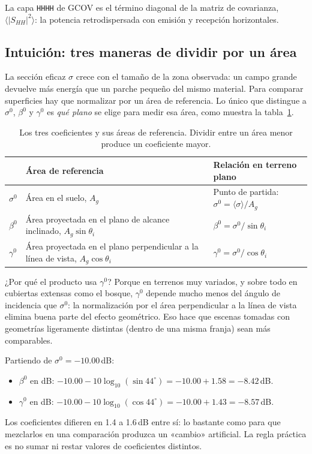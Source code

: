 \documentclass[11pt,a4paper]{article}
\begin{document}
La capa \texttt{HHHH} de GCOV es el término diagonal de la matriz de covarianza,
$\langle |S_{HH}|^2 \rangle$: la potencia retrodispersada con emisión y recepción horizontales.

\subsection{Intuición: tres maneras de dividir por un área}
\label{sec:tres-coef}

La sección eficaz $\sigma$ crece con el tamaño de la zona observada: un campo grande devuelve más energía que un
parche pequeño del mismo material. Para comparar superficies hay que normalizar por un área de referencia. Lo
único que distingue a $\sigma^0$, $\beta^0$ y $\gamma^0$ es \emph{qué plano} se elige para medir esa área,
como muestra la tabla~\ref{tab:areas-ref}.

\begin{table}[htbp]
\centering\small
\begin{tabularx}{\linewidth}{p{.1\linewidth}p{.38\linewidth}X}
\toprule
 & \textbf{Área de referencia} & \textbf{Relación en terreno plano}\\\midrule
$\sigma^0$ & Área en el suelo, $A_g$ & Punto de partida: $\sigma^0=\langle\sigma\rangle/A_g$\\
$\beta^0$ & Área proyectada en el plano de alcance inclinado, $A_g\sin\theta_i$ & $\beta^0=\sigma^0/\sin\theta_i$\\
$\gamma^0$ & Área proyectada en el plano perpendicular a la línea de vista, $A_g\cos\theta_i$ &
$\gamma^0=\sigma^0/\cos\theta_i$\\\bottomrule
\end{tabularx}
\caption{Los tres coeficientes y sus áreas de referencia. Dividir entre un área menor produce un coeficiente
mayor.}
\label{tab:areas-ref}
\end{table}

¿Por qué el producto usa $\gamma^0$? Porque en terrenos muy variados, y sobre todo en cubiertas extensas como
el bosque, $\gamma^0$ depende mucho menos del ángulo de incidencia que $\sigma^0$: la normalización por el área
perpendicular a la línea de vista elimina buena parte del efecto geométrico. Eso hace que escenas tomadas con
geometrías ligeramente distintas (dentro de una misma franja) sean más comparables.

\begin{ejemplo}[Los tres coeficientes con $\theta_i = 44^\circ$ en terreno plano]
Partiendo de $\sigma^0=-10.00$\,dB:
\begin{itemize}
  \item $\beta^0$ en dB: $-10.00-10\log_{10}(\sin 44^\circ)=-10.00+1.58=-8.42$\,dB.
  \item $\gamma^0$ en dB: $-10.00-10\log_{10}(\cos 44^\circ)=-10.00+1.43=-8.57$\,dB.
\end{itemize}
Los coeficientes difieren en 1.4 a 1.6\,dB entre sí: lo bastante como para que mezclarlos en una comparación
produzca un «cambio» artificial. La regla práctica es no sumar ni restar valores de coeficientes distintos.
\end{ejemplo}
\end{document}
